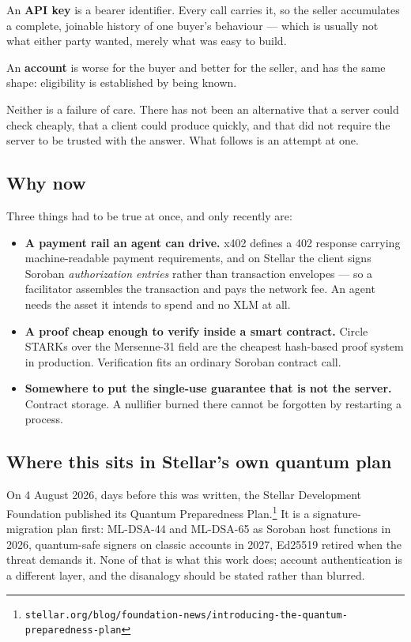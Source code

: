 \documentclass[11pt,a4paper]{article}
\begin{document}
An \textbf{API key} is a bearer identifier. Every call carries it, so the seller
accumulates a complete, joinable history of one buyer's behaviour --- which is
usually not what either party wanted, merely what was easy to build.

An \textbf{account} is worse for the buyer and better for the seller, and has the
same shape: eligibility is established by being known.

Neither is a failure of care. There has not been an alternative that a server
could check cheaply, that a client could produce quickly, and that did not
require the server to be trusted with the answer. What follows is an attempt at
one.

\subsection{Why now}

Three things had to be true at once, and only recently are:

\begin{itemize}
  \item \textbf{A payment rail an agent can drive.} x402 defines a 402 response
    carrying machine-readable payment requirements, and on Stellar the client
    signs Soroban \emph{authorization entries} rather than transaction
    envelopes --- so a facilitator assembles the transaction and pays the
    network fee. An agent needs the asset it intends to spend and no XLM at
    all.
  \item \textbf{A proof cheap enough to verify inside a smart contract.}
    Circle STARKs over the Mersenne-31 field are the cheapest hash-based proof
    system in production. Verification fits an ordinary Soroban contract call.
  \item \textbf{Somewhere to put the single-use guarantee that is not the
    server.} Contract storage. A nullifier burned there cannot be forgotten by
    restarting a process.
\end{itemize}

\subsection{Where this sits in Stellar's own quantum plan}

On 4 August 2026, days before this was written, the Stellar Development
Foundation published its Quantum Preparedness
Plan.\footnote{\texttt{stellar.org/blog/foundation-news/introducing-the-quantum-preparedness-plan}}
It is a signature-migration plan first: ML-DSA-44 and ML-DSA-65 as Soroban host
functions in 2026, quantum-safe signers on classic accounts in 2027, Ed25519
retired when the threat demands it. None of that is what this work does; account
authentication is a different layer, and the disanalogy should be stated rather
than blurred.
\end{document}
